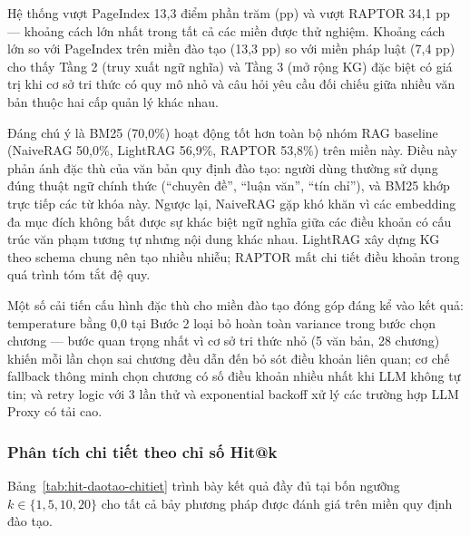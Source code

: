 Hệ thống vượt PageIndex 13,3 điểm phần trăm (pp) và vượt RAPTOR 34,1 pp ---
khoảng cách lớn nhất trong tất cả các miền được thử nghiệm. Khoảng cách lớn so với
PageIndex trên miền đào tạo (13,3 pp) so với miền pháp luật (7,4 pp) cho thấy Tầng 2
(truy xuất ngữ nghĩa) và Tầng 3 (mở rộng KG) đặc biệt có giá trị khi cơ sở tri thức có
quy mô nhỏ và câu hỏi yêu cầu đối chiếu giữa nhiều văn bản thuộc hai cấp quản lý
khác nhau.

Đáng chú ý là BM25 (70,0\%) hoạt động tốt hơn toàn bộ nhóm RAG baseline
(NaiveRAG 50,0\%, LightRAG 56,9\%, RAPTOR 53,8\%) trên miền này. Điều này phản
ánh đặc thù của văn bản quy định đào tạo: người dùng thường sử dụng đúng thuật ngữ
chính thức (``chuyên đề'', ``luận văn'', ``tín chỉ''), và BM25 khớp trực tiếp các từ
khóa này. Ngược lại, NaiveRAG gặp khó khăn vì các embedding đa mục đích không bắt
được sự khác biệt ngữ nghĩa giữa các điều khoản có cấu trúc văn phạm tương tự nhưng
nội dung khác nhau. LightRAG xây dựng KG theo schema chung nên tạo nhiều nhiễu;
RAPTOR mất chi tiết điều khoản trong quá trình tóm tắt đệ quy.

Một số cải tiến cấu hình đặc thù cho miền đào tạo đóng góp đáng kể vào kết quả:
temperature bằng 0,0 tại Bước 2 loại bỏ hoàn toàn variance trong bước chọn chương
--- bước quan trọng nhất vì cơ sở tri thức nhỏ (5 văn bản, 28 chương) khiến mỗi lần
chọn sai chương đều dẫn đến bỏ sót điều khoản liên quan; cơ chế fallback thông minh
chọn chương có số điều khoản nhiều nhất khi LLM không tự tin; và retry logic với 3
lần thử và exponential backoff xử lý các trường hợp LLM Proxy có tải cao.

\subsubsection*{Phân tích chi tiết theo chỉ số Hit@k}

Bảng~\ref{tab:hit-daotao-chitiet} trình bày kết quả đầy đủ tại bốn ngưỡng $k \in \{1, 5, 10, 20\}$
cho tất cả bảy phương pháp được đánh giá trên miền quy định đào tạo.


